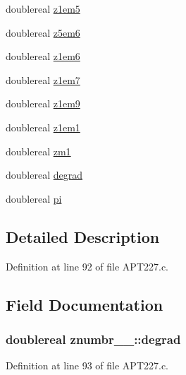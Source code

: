 \begin{DoxyCompactItemize}
\item 
doublereal \hyperlink{structznumbr__1___a1ce9728876d6335656a45f2243cd0c9f}{z1em5}
\item 
doublereal \hyperlink{structznumbr__1___ad464dc774032378a5ba1a3409d6d0d33}{z5em6}
\item 
doublereal \hyperlink{structznumbr__1___af025ed31c05aed9c0f7934947199e949}{z1em6}
\item 
doublereal \hyperlink{structznumbr__1___a077de2d2a833f4fbc90b9073a0b45b81}{z1em7}
\item 
doublereal \hyperlink{structznumbr__1___aa0ba99d3473098e17785f2deab542751}{z1em9}
\item 
doublereal \hyperlink{structznumbr__1___a3081550e6fc73b82831002c6e61ead15}{z1em1}
\item 
doublereal \hyperlink{structznumbr__1___a1f6fbbb0ee33439c7ad18df0c20c9d80}{zm1}
\item 
doublereal \hyperlink{structznumbr__1___a8a5458be478635e9ae0889ff18e923ae}{degrad}
\item 
doublereal \hyperlink{structznumbr__1___aee6a3c0e4f0734ccb84894bc03b7ae1f}{pi}
\end{DoxyCompactItemize}


\subsection{Detailed Description}


Definition at line 92 of file A\+P\+T227.\+c.



\subsection{Field Documentation}
\subsubsection[{\texorpdfstring{degrad}{degrad}}]{\setlength{\rightskip}{0pt plus 5cm}doublereal znumbr\+\_\+\_\+\+::degrad}\hypertarget{structznumbr__1___a8a5458be478635e9ae0889ff18e923ae}{}\label{structznumbr__1___a8a5458be478635e9ae0889ff18e923ae}


Definition at line 93 of file A\+P\+T227.\+c.

